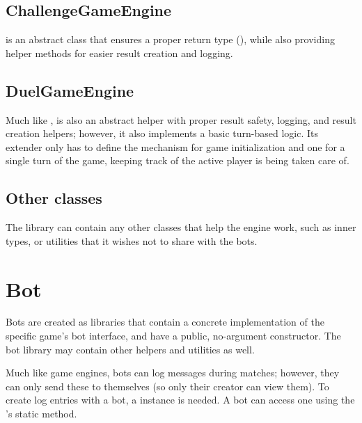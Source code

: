 		\subsection*{ChallengeGameEngine}
		
		 is an abstract class that ensures a proper return type (), while also providing helper methods for easier result creation and logging.
		
		\subsection*{DuelGameEngine}
		
		Much like ,  is also an abstract helper with proper result safety, logging, and result creation helpers; however, it also implements a basic turn-based logic. Its extender only has to define the mechanism for game initialization and one for a single turn of the game, keeping track of the active player is being taken care of.
		
		\subsection*{Other classes}
		
		The library can contain any other classes that help the engine work, such as inner types, or utilities that it wishes not to share with the bots.

	\section{Bot}
	
	Bots are created as libraries that contain a concrete implementation of the specific game's bot interface, and have a public, no-argument constructor. The bot library may contain other helpers and utilities as well.

	Much like game engines, bots can log messages during matches; however, they can only send these to themselves (so only their creator can view them). To create log entries with a bot, a  instance is needed. A bot can access one using the 's static  method.
	
